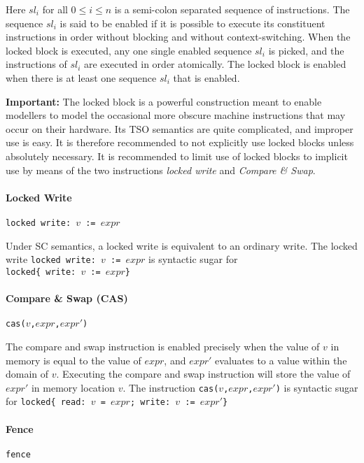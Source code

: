 \documentclass[a4paper]{article}
\begin{document}
Here $sl_i$ for all $0 \leq i \leq n$ is a semi-colon separated
sequence of instructions. The sequence $sl_i$ is said to be enabled if
it is possible to execute its constituent instructions in order
without blocking and without context-switching. When the locked block
is executed, any one single enabled sequence $sl_i$ is picked, and the
instructions of $sl_i$ are executed in order atomically. The locked
block is enabled when there is at least one sequence $sl_i$ that is
enabled.

{\bf Important:} The locked block is a powerful construction meant to
enable modellers to model the occasional more obscure machine
instructions that may occur on their hardware. Its TSO semantics are
quite complicated, and improper use is easy. It is therefore
recommended to not explicitly use locked blocks unless absolutely
necessary. It is recommended to limit use of locked blocks to implicit
use by means of the two instructions \emph{locked write} and
\emph{Compare \& Swap}.

\paragraph{Locked Write} \verb+locked write: +$v$\verb+ := +$expr$

Under SC semantics, a locked write is equivalent to an ordinary
write. The locked write \verb+locked write: +$v$\verb+ := +$expr$ is
syntactic sugar for \\\verb+locked{ write: +$v$\verb+ := +$expr$\verb+}+

\paragraph{Compare \& Swap (CAS)} \verb+cas(+$v$\verb+,+$expr$\verb+,+$expr'$\verb+)+

The compare and swap instruction is enabled precisely when the value
of $v$ in memory is equal to the value of $expr$, and $expr'$ evaluates
to a value within the domain of $v$. Executing the compare and swap
instruction will store the value of $expr'$ in memory location
$v$. The instruction
\verb+cas(+$v$\verb+,+$expr$\verb+,+$expr'$\verb+)+ is syntactic sugar
for
\verb+locked{ read: +$v$\verb+ = +$expr$\verb+; write: +$v$\verb+ := +$expr'$\verb+}+

\paragraph{Fence} \verb+fence+
\end{document}
